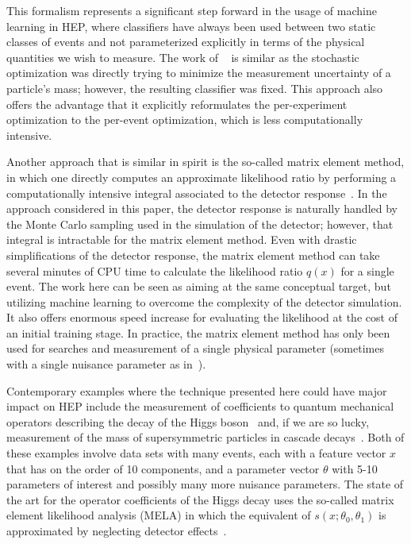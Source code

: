 \documentclass[12pt]{article}
\numberwithin{equation}{section}
\theoremstyle{plain}
\begin{document}
This formalism represents a significant step forward in the usage of machine
learning in HEP, where classifiers have always been used between two static
classes of events and not parameterized explicitly in terms of the physical
quantities we wish to measure. The work of  ~\citep{Whiteson:2006ws} is similar
as the stochastic optimization was directly trying to minimize the measurement
uncertainty of a particle's mass; however, the resulting classifier was fixed.
This approach also offers the advantage that it explicitly reformulates the
per-experiment optimization to the per-event optimization, which is less
computationally intensive.

Another approach that is similar in spirit is the so-called matrix element
method, in which one  directly computes an approximate likelihood ratio by
performing a computationally intensive integral associated to the detector
response~\citep{Volobouev:2011vb}. In the approach considered in this paper, the
detector response is naturally handled by the Monte Carlo sampling used in the
simulation of the detector; however, that integral is intractable for the matrix
element method. Even with drastic simplifications of the detector response, the
matrix element method can take several minutes of CPU time to calculate the
likelihood ratio $q(x)$ for a single event. The work here can be seen as aiming
at the same conceptual target, but utilizing machine learning to overcome the
complexity of the detector simulation. It also offers enormous speed increase
for evaluating the likelihood at the cost of an initial training stage. In
practice, the matrix element method has only been used for searches and
measurement of a single physical parameter (sometimes with a single nuisance
parameter as in~\citep{Aaltonen:2010yz}).

Contemporary examples where the technique presented here could have major impact
on HEP include the measurement of coefficients to quantum mechanical operators
describing the decay of the Higgs boson~\citep{Chen:2014pia} and, if we are so
lucky, measurement of the mass of supersymmetric particles in cascade
decays~\citep{Allanach:2000kt}.  Both of these examples involve data sets with
many events, each with a feature vector $x$ that has on the order of 10
components, and a parameter vector $\theta$ with 5-10 parameters of interest and
possibly many more nuisance parameters. The state of the art for the operator
coefficients of the Higgs decay uses the so-called matrix element likelihood
analysis (MELA) in which the equivalent of $s(x; \theta_0, \theta_1)$ is
approximated by neglecting detector effects~\citep{Gao:2010qx,Bolognesi:2012mm}.
\end{document}
